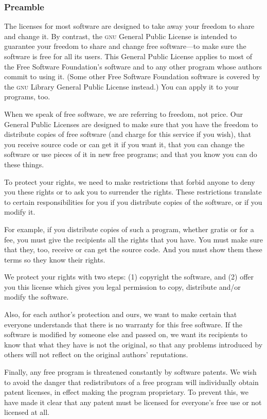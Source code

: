 \documentclass{article}
\begin{document}
\subsubsection{Preamble}

The licenses for most software are designed to take away your freedom to
share and change it.  By contrast, the \textsc{gnu} General Public License is
intended to guarantee your freedom to share and change free software---to
make sure the software is free for all its users.  This General Public
License applies to most of the Free Software Foundation's software and to
any other program whose authors commit to using it.  (Some other Free
Software Foundation software is covered by the \textsc{gnu} Library
General Public License instead.)  You can apply it to your programs, too.

When we speak of free software, we are referring to freedom, not price.
Our General Public Licenses are designed to make sure that you have the
freedom to distribute copies of free software (and charge for this service
if you wish), that you receive source code or can get it if you want it,
that you can change the software or use pieces of it in new free programs;
and that you know you can do these things.

To protect your rights, we need to make restrictions that forbid anyone to
deny you these rights or to ask you to surrender the rights.  These
restrictions translate to certain responsibilities for you if you
distribute copies of the software, or if you modify it.

For example, if you distribute copies of such a program, whether gratis or
for a fee, you must give the recipients all the rights that you have.  You
must make sure that they, too, receive or can get the source code.  And
you must show them these terms so they know their rights.

We protect your rights with two steps: (1) copyright the software, and (2)
offer you this license which gives you legal permission to copy,
distribute and/or modify the software.

Also, for each author's protection and ours, we want to make certain that
everyone understands that there is no warranty for this free software.  If
the software is modified by someone else and passed on, we want its
recipients to know that what they have is not the original, so that any
problems introduced by others will not reflect on the original authors'
reputations.

Finally, any free program is threatened constantly by software patents.
We wish to avoid the danger that redistributors of a free program will
individually obtain patent licenses, in effect making the program
proprietary.  To prevent this, we have made it clear that any patent must
be licensed for everyone's free use or not licensed at all.
\end{document}
